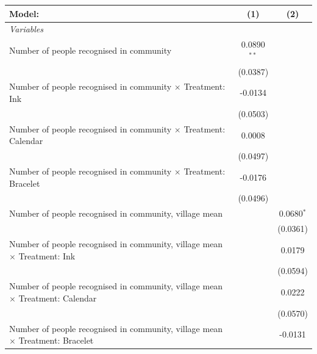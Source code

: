 
\begingroup
\centering
\begin{tabular}{lcc}
   \tabularnewline \midrule \midrule
   Model:                                                                               & (1)           & (2)\\  
   \midrule
   \emph{Variables}\\
   Number of people recognised in community                                             & 0.0890$^{**}$ &   \\   
                                                                                        & (0.0387)      &   \\   
   Number of people recognised in community $\times$ Treatment: Ink                     & -0.0134       &   \\   
                                                                                        & (0.0503)      &   \\   
   Number of people recognised in community $\times$ Treatment: Calendar                & 0.0008        &   \\   
                                                                                        & (0.0497)      &   \\   
   Number of people recognised in community $\times$ Treatment: Bracelet                & -0.0176       &   \\   
                                                                                        & (0.0496)      &   \\   
   Number of people recognised in community, village mean                               &               & 0.0680$^{*}$\\   
                                                                                        &               & (0.0361)\\   
   Number of people recognised in community, village mean $\times$ Treatment: Ink       &               & 0.0179\\   
                                                                                        &               & (0.0594)\\   
   Number of people recognised in community, village mean $\times$ Treatment: Calendar  &               & 0.0222\\   
                                                                                        &               & (0.0570)\\   
   Number of people recognised in community, village mean $\times$ Treatment: Bracelet  &               & -0.0131\\   

\end{tabular}
